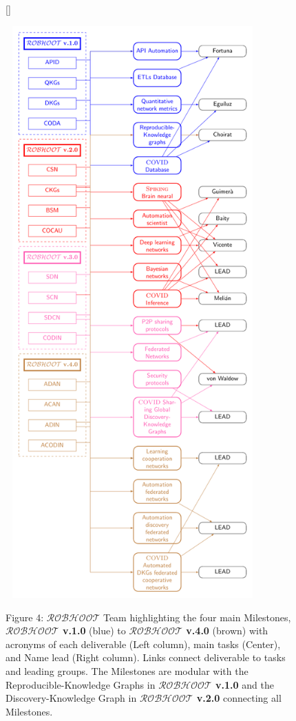 \documentclass[11pt, a4paper]{article} %
\begin{document}
\begin{figure}[h!]
  [\FBwidth]
  {\caption*{Figure 4: $\mathcal{ROBHOOT}$ Team highlighting the four
      main Milestones, {\bf $\mathcal{ROBHOOT}$ v.1.0} (blue) to {\bf
        $\mathcal{ROBHOOT}$ v.4.0} (brown) with acronyms of each
      deliverable (Left column), main tasks (Center), and Name lead
      (Right column). Links connect deliverable to tasks and leading
      groups. The Milestones are modular with the
      Reproducible-Knowledge Graphs in {\bf $\mathcal{ROBHOOT}$ v.1.0}
      and the Discovery-Knowledge Graph in {\bf $\mathcal{ROBHOOT}$
        v.2.0} connecting all Milestones.} \label{fig:test}}
  {\includegraphics[width=9.75cm,height=22cm]{Figures/Consortium.pdf}}
\end{figure}
  
\end{document}
